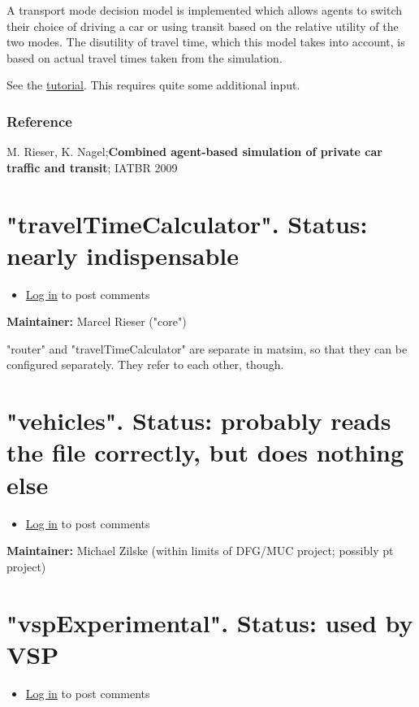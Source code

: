 \documentclass[a4paper,11pt]{report}
\begin{document}
A transport mode decision model is implemented which allows agents to  switch their choice of driving a car or using transit based on the  relative utility of the two modes. The disutility of travel time, which  this model takes into account, is based on actual travel times taken  from the simulation.

See the \href{http://matsim.org/docs/tutorials/transit}{tutorial}. This requires quite some additional input.

\subsubsection{Reference}

M. Rieser, K. Nagel;\textbf{Combined agent-based simulation of private car traffic and transit}; IATBR 2009

\vfill\eject
\section{"travelTimeCalculator". Status: nearly indispensable}
\begin{itemize}
	\item \href{http://www.matsim.org/user/login?destination=comment/reply/401%23comment-form}{Log in} to post comments
\end{itemize}

\textbf{Maintainer:} Marcel Rieser ("core")

"router" and "travelTimeCalculator" are separate in matsim, so that  they can be configured separately. They refer to each other,  though.

\vfill\eject
\section{"vehicles". Status: probably reads the file correctly, but does nothing else}
\begin{itemize}
	\item \href{http://www.matsim.org/user/login?destination=comment/reply/515%23comment-form}{Log in} to post comments
\end{itemize}

\textbf{Maintainer:} Michael Zilske (within limits of DFG/MUC project; possibly pt project)

\vfill\eject
\section{"vspExperimental". Status: used by VSP}
\begin{itemize}
	\item \href{http://www.matsim.org/user/login?destination=comment/reply/630%23comment-form}{Log in} to post comments
\end{itemize}
\end{document}

